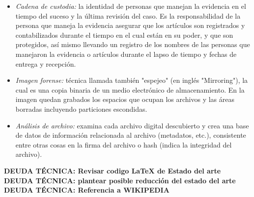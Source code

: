 \begin{itemize}
    \item \emph{Cadena de custodia:} la identidad de personas que manejan la evidencia en el tiempo del suceso y la última revisión del caso. Es la responsabilidad de la persona que maneja la evidencia asegurar que los artículos son registrados y contabilizados durante el tiempo en el cual están en su poder, y que son protegidos, así mismo llevando un registro de los nombres de las personas que manejaron la evidencia o artículos durante el lapso de tiempo y fechas de entrega y recepción.
    \item \emph{Imagen forense:} técnica llamada también "espejeo" (en inglés "Mirroring"), la cual es una copia binaria de un medio electrónico de almacenamiento. En la imagen quedan grabados los espacios que ocupan los archivos y las áreas borradas incluyendo particiones escondidas.
    \item \emph{Análisis de archivo:} examina cada archivo digital descubierto y crea una base de datos de información relacionada al archivo (metadatos, etc.), consistente entre otras cosas en la firma del archivo o hash (indica la integridad del archivo).
\end{itemize}

{\color{red}\textbf{DEUDA TÉCNICA: Revisar codigo LaTeX de Estado del arte}}
{\color{red}\textbf{DEUDA TÉCNICA: plantear posible reducción del estado del arte}}
{\color{red}\textbf{DEUDA TÉCNICA: Referencia a WIKIPEDIA}}
